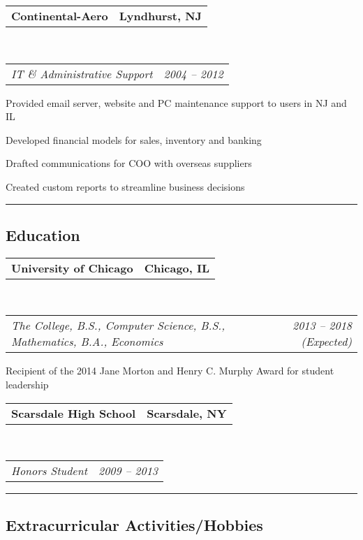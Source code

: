 \documentclass[10pt,letterpaper]{article}
\makeatletter
\newcommand{\headerrow}[2]
{\noindent \begin{tabular*}{\linewidth}{l@{\extracolsep{\fill}}r}
	#1 &
	#2 \\
\end{tabular*}}
\makeatother
\begin{document}
	\headerrow
		{\textbf{Continental-Aero} }
		{\textbf{Lyndhurst, NJ}}
	\\
	\headerrow
		{\emph{IT \& Administrative Support}}
		{\emph{2004 -- 2012}}
	\begin{itemize*}
        
		\item Provided email server, website and PC maintenance support to users in NJ and IL
        
		\item Developed financial models for sales, inventory and banking
        
		\item Drafted communications for COO with overseas suppliers
        
		\item Created custom reports to streamline business decisions
        
	\end{itemize*}


\vspace{0.4em}
\hrule
\vspace{-0.4em}
\subsection*{Education}

    
	\headerrow
		{\textbf{University of Chicago}}
		{\textbf{Chicago, IL}}
	\\
	\headerrow
		{\emph{The College, B.S., Computer Science, B.S., Mathematics, B.A., Economics}}
		{\emph{2013 -- 2018 (Expected)}}
    Recipient of the 2014 Jane Morton and Henry C. Murphy Award for student leadership

    
	\headerrow
		{\textbf{Scarsdale High School}}
		{\textbf{Scarsdale, NY}}
	\\
	\headerrow
		{\emph{Honors Student}}
		{\emph{2009 -- 2013}}
    
    

\vspace{0.8em}
\hrule
\vspace{-0.4em}
\subsection*{Extracurricular Activities/Hobbies}
\end{document}

